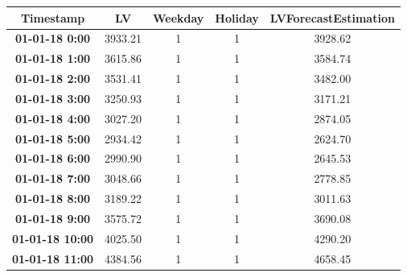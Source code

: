 \begin{table}[h!]
\centering
\begin{tabular}{|c|c|c|c|c|}
\hline
\textbf{Timestamp}      & \textbf{LV} & \textbf{Weekday} & \textbf{Holiday} & \textbf{LVForecastEstimation} \\ \hline
\textbf{01-01-18 0:00}  & 3933.21     & 1                & 1                & 3928.62                       \\ \hline
\textbf{01-01-18 1:00}  & 3615.86     & 1                & 1                & 3584.74                       \\ \hline
\textbf{01-01-18 2:00}  & 3531.41     & 1                & 1                & 3482.00                       \\ \hline
\textbf{01-01-18 3:00}  & 3250.93     & 1                & 1                & 3171.21                       \\ \hline
\textbf{01-01-18 4:00}  & 3027.20     & 1                & 1                & 2874.05                       \\ \hline
\textbf{01-01-18 5:00}  & 2934.42     & 1                & 1                & 2624.70                       \\ \hline
\textbf{01-01-18 6:00}  & 2990.90     & 1                & 1                & 2645.53                       \\ \hline
\textbf{01-01-18 7:00}  & 3048.66     & 1                & 1                & 2778.85                       \\ \hline
\textbf{01-01-18 8:00}  & 3189.22     & 1                & 1                & 3011.63                       \\ \hline
\textbf{01-01-18 9:00}  & 3575.72     & 1                & 1                & 3690.08                       \\ \hline
\textbf{01-01-18 10:00} & 4025.50     & 1                & 1                & 4290.20                       \\ \hline
\textbf{01-01-18 11:00} & 4384.56     & 1                & 1                & 4658.45                       \\ \hline
\end{tabular}
\end{table}

